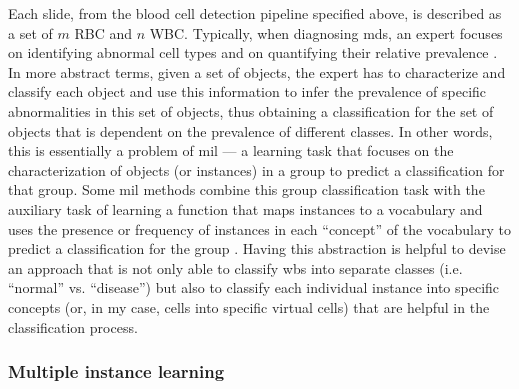 Each slide, from the blood cell detection pipeline specified above, is described as a set of $m$ RBC and $n$ WBC. Typically, when diagnosing \ac{mds}, an expert focuses on identifying abnormal cell types and on quantifying their relative prevalence \cite{Valent2017-uh}. In more abstract terms, given a set of objects, the expert has to characterize and classify each object and use this information to infer the prevalence of specific abnormalities in this set of objects, thus obtaining a classification for the set of objects that is dependent on the prevalence of different classes. In other words, this is essentially a problem of \ac{mil} --- a learning task that focuses on the characterization of objects (or instances) in a group to predict a classification for that group. Some \ac{mil} methods combine this group classification task with the auxiliary task of learning a function that maps instances to a vocabulary and uses the presence or frequency of instances in each “concept” of the vocabulary to predict a classification for the group \cite{Amores2013-ym}. Having this abstraction is helpful to devise an approach that is not only able to classify \ac{wbs} into separate classes (i.e. “normal” vs. “disease”) but also to classify each individual instance into specific concepts (or, in my case, cells into specific virtual cells) that are helpful in the classification process. 

\subsubsection{Multiple instance learning}

